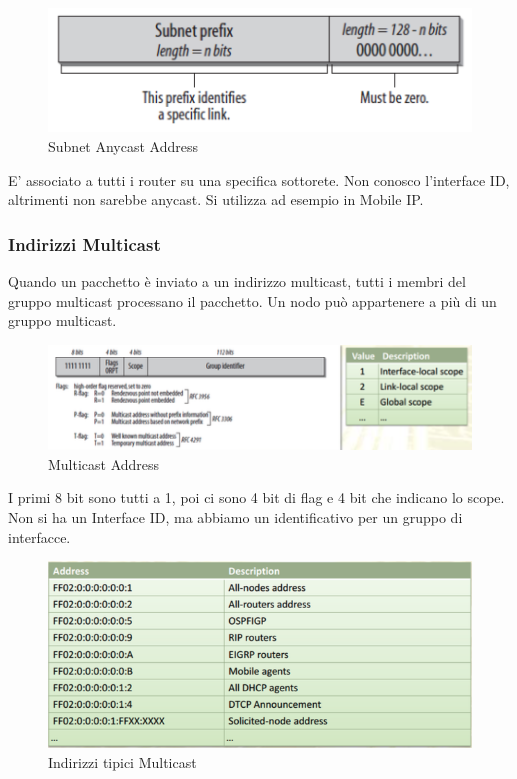 \documentclass{article}
\begin{document}
\begin{figure}[H]
\centering
\includegraphics[scale=0.5]{figures/subnet anycast.png}
\caption{Subnet Anycast Address}
\end{figure}

E' associato a tutti i router su una specifica sottorete. Non conosco l'interface ID, altrimenti non sarebbe anycast. Si utilizza ad esempio in Mobile IP.

\subsubsection{Indirizzi Multicast}
Quando un pacchetto è inviato a un indirizzo multicast, tutti i membri del gruppo multicast processano il pacchetto. Un nodo può appartenere a più di un gruppo multicast.

\begin{figure}[H]
\centering
\includegraphics[scale=0.5]{figures/multicast address.png}
\caption{Multicast Address}
\end{figure}

I primi 8 bit sono tutti a 1, poi ci sono 4 bit di flag e 4 bit che indicano lo scope. Non si ha un Interface ID, ma abbiamo un identificativo per un gruppo di interfacce.

\begin{figure}[H]
\centering
\includegraphics[scale=0.4]{figures/indirizzi tipici multicast.png}
\caption{Indirizzi tipici Multicast}
\end{figure}
\end{document}
